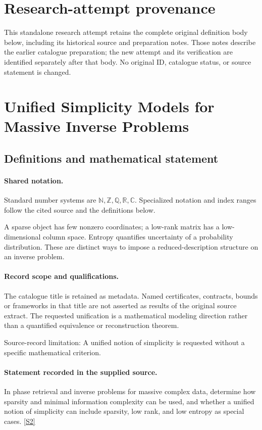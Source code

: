 \documentclass[11pt]{article}
\begin{document}
\section*{Research-attempt provenance}
This standalone research attempt retains the complete original definition body below,
including its historical source and preparation notes. Those notes describe the
earlier catalogue preparation; the new attempt and its verification are identified
separately after that body. No original ID, catalogue status, or source statement is changed.

\section{Unified Simplicity Models for Massive Inverse Problems}\label{statement}

\subsection{Definitions and mathematical statement}

\paragraph{Shared notation.}Standard number systems are $\mathbb N,\mathbb Z,\mathbb Q,\mathbb R,\mathbb C$. Specialized notation and index ranges follow the cited source and the definitions below.


A sparse object has few nonzero coordinates; a low-rank matrix has a low-dimensional column space. Entropy quantifies uncertainty of a probability distribution. These are distinct ways to impose a reduced-description structure on an inverse problem.
\paragraph{Record scope and qualifications.}
The catalogue title is retained as metadata. Named certificates, contracts, bounds or frameworks in that title are not asserted as results of the original source extract.
The requested unification is a mathematical modeling direction rather than a quantified equivalence or reconstruction theorem.

Source-record limitation: A unified notion of simplicity is requested without a specific mathematical criterion.
\paragraph{Statement recorded in the supplied source.}
In phase retrieval and inverse problems for massive complex data, determine how sparsity and minimal information complexity can be used, and whether a unified notion of simplicity can include sparsity, low rank, and low entropy as special cases. \href{https://doi.org/10.4171/owr/2018/14}{[S2]}
\end{document}
